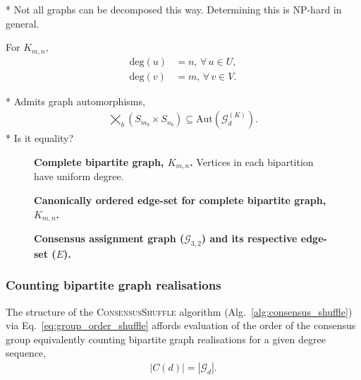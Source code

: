 * Not all graphs can be decomposed this way. Determining this is NP-hard in general.

For $K_{m,n}$,
\begin{align}
	\mathrm{deg}(u) & =n,\,\forall\, u\in U,\nonumber \\
	\mathrm{deg}(v) & =m,\,\forall\, v\in V.
\end{align}

* Admits graph automorphisms,
\begin{align}
	\bigtimes_{b} (S_{m_b}\times S_{n_b}) \subseteq \mathrm{Aut}(\mathcal{G}_d^{(K)}).
\end{align}
* Is it equality?

\begin{figure}[!htb]
	
	\caption{\textbf{Complete bipartite graph, $K_{m,n}$.} Vertices in each bipartition have uniform degree.} \label{fig:K_mn_graph}
\end{figure}

\begin{figure}[!htb]
	
	\caption{\textbf{Canonically ordered edge-set for complete bipartite graph, $K_{m,n}$.}} \label{fig:K_mn_edges}
\end{figure}

\begin{figure}[!htb]
	\centering
	\begin{minipage}[t]{0.4\columnwidth}
		
	\end{minipage}
	\quad
	\begin{minipage}[t]{0.3\columnwidth}
		
	\end{minipage}
	\caption{\textbf{Consensus assignment graph ($\mathcal{G}_{3,2}$) and its respective edge-set ($E$).}} \label{fig:G_32_edges}
\end{figure}

\subsubsection{Counting bipartite graph realisations} \label{sec:count_real}

The structure of the \textsc{ConsensusShuffle} algorithm (Alg.~\ref{alg:consensus_shuffle}) via Eq.~\eqref{eq:group_order_shuffle} affords evaluation of the order of the consensus group equivalently counting bipartite graph realisations for a given degree sequence,
\begin{align}
	|C(d)| = |\mathcal{G}_d|.
\end{align}

